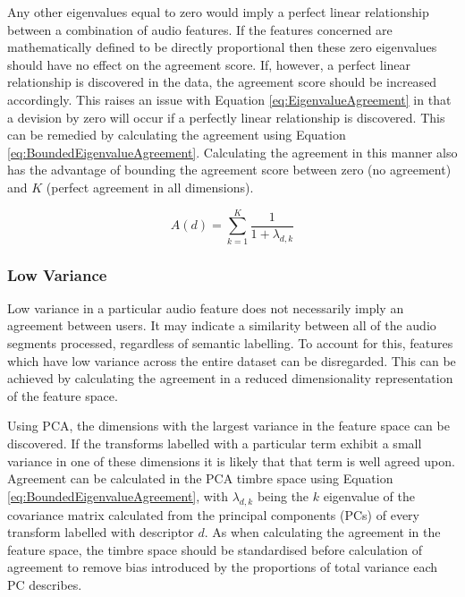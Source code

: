 			Any other eigenvalues equal to zero would imply a perfect linear relationship between a combination
			of audio features. If the features concerned are mathematically defined to be directly proportional
			then these zero eigenvalues should have no effect on the agreement score. If, however, a perfect
			linear relationship is discovered in the data, the agreement score should be increased
			accordingly. This raises an issue with Equation \ref{eq:EigenvalueAgreement} in that a devision by
			zero will occur if a perfectly linear relationship is discovered. This can be remedied by
			calculating the agreement using Equation \ref{eq:BoundedEigenvalueAgreement}. Calculating the
			agreement in this manner also has the advantage of bounding the agreement score between zero (no
			agreement) and $K$ (perfect agreement in all dimensions).

			\begin{equation}
				A(d) = \sum_{k = 1}^{K} \frac{1}{1 + \lambda_{d,k}}
				\label{eq:BoundedEigenvalueAgreement}
			\end{equation}

		\subsubsection*{Low Variance}
			Low variance in a particular audio feature does not necessarily imply an agreement between users.
			It may indicate a similarity between all of the audio segments processed, regardless of semantic
			labelling. To account for this, features which have low variance across the entire dataset can be
			disregarded. This can be achieved by calculating the agreement in a reduced dimensionality
			representation of the feature space.

			Using PCA, the dimensions with the largest variance in the feature space can be discovered. If the
			transforms labelled with a particular term exhibit a small variance in one of these dimensions it
			is likely that that term is well agreed upon. Agreement can be calculated in the PCA timbre space
			using Equation \ref{eq:BoundedEigenvalueAgreement}, with $\lambda_{d,k}$ being the $k$
			eigenvalue of the covariance matrix calculated from the principal components (PCs) of every
			transform labelled with descriptor $d$. As when calculating the agreement in the feature space, the
			timbre space should be standardised before calculation of agreement to remove bias introduced by
			the proportions of total variance each PC describes.

